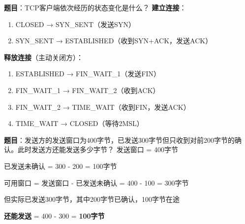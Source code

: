 \begin{examplebox}[例题5.7 TCP连接状态转换]
\textbf{题目}：TCP客户端依次经历的状态变化是什么？
\tcblower
\textbf{建立连接}：
\begin{enumerate}[itemsep=0pt]
    \item CLOSED → SYN\_SENT（发送SYN）
    \item SYN\_SENT → ESTABLISHED（收到SYN+ACK，发送ACK）
\end{enumerate}

\textbf{释放连接}（主动关闭方）：
\begin{enumerate}[itemsep=0pt]
    \item ESTABLISHED → FIN\_WAIT\_1（发送FIN）
    \item FIN\_WAIT\_1 → FIN\_WAIT\_2（收到ACK）
    \item FIN\_WAIT\_2 → TIME\_WAIT（收到FIN，发送ACK）
    \item TIME\_WAIT → CLOSED（等待2MSL）
\end{enumerate}
\end{examplebox}

\begin{examplebox}[例题5.8 滑动窗口]
\textbf{题目}：发送方的发送窗口为400字节，已发送300字节但只收到对前200字节的确认。此时发送方还能发送多少字节？
\tcblower
发送窗口 = 400字节

已发送未确认 = 300 - 200 = 100字节

可用窗口 = 发送窗口 - 已发送未确认 = 400 - 100 = 300字节

但实际已发送300字节，其中200字节已确认，100字节在途

\textbf{还能发送} = 400 - 300 = \textbf{100字节}
\end{examplebox}
